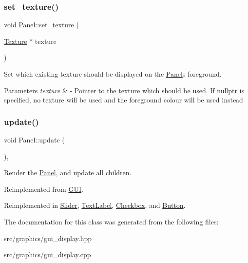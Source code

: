 \subsubsection{\texorpdfstring{set\+\_\+texture()}{set\_texture()}}
{\footnotesize\ttfamily void Panel\+::set\+\_\+texture (\begin{DoxyParamCaption}\item[{\mbox{\hyperlink{class_texture}{Texture}} $\ast$}]{texture }\end{DoxyParamCaption})}

Set which existing texture should be displayed on the \mbox{\hyperlink{class_panel}{Panel}}\textquotesingle{}s foreground. 
\begin{DoxyParams}{Parameters}
{\em texture} & -\/ Pointer to the texture which should be used. If nullptr is specified, no texture will be used and the foreground colour will be used instead \\
\hline
\end{DoxyParams}
\mbox{\label{class_panel_a9e9c0608cf3139833cde6b73dc3ba443}} 
\subsubsection{\texorpdfstring{update()}{update()}}
{\footnotesize\ttfamily void Panel\+::update (\begin{DoxyParamCaption}{ }\end{DoxyParamCaption})\hspace{0.3cm}{\ttfamily [override]}, {\ttfamily [virtual]}}

Render the \mbox{\hyperlink{class_panel}{Panel}}, and update all children. 

Reimplemented from \mbox{\hyperlink{class_g_u_i_a947e568bf884a8798e3e368417f662c7}{G\+UI}}.



Reimplemented in \mbox{\hyperlink{class_slider_a4ebd527db54ea263c7d0efe4d1f94e1b}{Slider}}, \mbox{\hyperlink{class_text_label_a350a9edc23e4d2a53374fddc5ddc61cc}{Text\+Label}}, \mbox{\hyperlink{class_checkbox_a69c9fb9ce334fc8ff76c49447f1e002d}{Checkbox}}, and \mbox{\hyperlink{class_button_abda97f1ae8e081da3dbd0b77a27cad9d}{Button}}.



The documentation for this class was generated from the following files\+:\begin{DoxyCompactItemize}
\item 
src/graphics/gui\+\_\+display.\+hpp\item 
src/graphics/gui\+\_\+display.\+cpp\end{DoxyCompactItemize}
